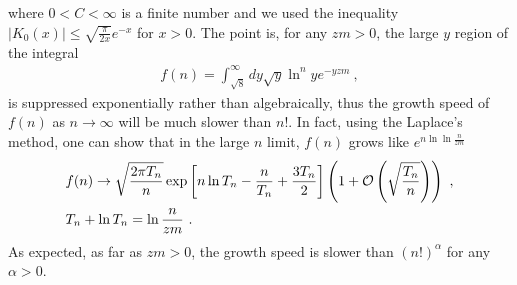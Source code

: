 \documentclass[a4paper,11pt]{article}
\begin{document}
where $0<C<\infty$ is a finite number and we used the inequality $|K_0(x)|\le \sqrt{\frac{\pi}{2x}}e^{-x}$ for $x>0$. The point is, for any $zm>0$, the large $y$ region of the integral 
\begin{align}
f(n)=\int_{\sqrt{8}}^\infty dy \sqrt{y} \ln^{n}ye^{-yzm} \ ,
\end{align}
is suppressed exponentially rather than algebraically, thus the growth speed of $f(n)$ as $n\rightarrow \infty$ will be much slower than $n!$. In fact, using the Laplace's method, one can show that in the large $n$ limit, $f(n)$ grows like $e^{n\ln \ln \frac{n}{zm}}$
\begin{align}
&f(n)\rightarrow\sqrt{\frac{2\pi T_n}{n}}\exp\left[n\ln T_n-\frac{n}{T_n}+\frac{3T_n}{2}\right]\left(1+{\cal O}\left(\sqrt{\frac{T_n}{n}}\right)\right) \ , \\ 
&T_n+\ln T_n=\ln \frac{n}{zm} \ .
\end{align}
As expected, as far as $zm>0$, the growth speed is slower than $(n!)^{\alpha}$ for any $\alpha>0$. 
\end{document}

